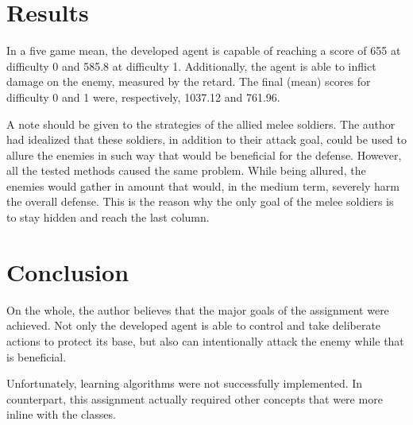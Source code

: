\documentclass[conference]{IEEEtran}
\begin{document}
\section{Results}

In a five game mean, the developed agent is capable of reaching a score of 655 at difficulty 0 and 585.8 at difficulty 1. Additionally, the agent is able to inflict damage on the enemy, measured by the retard. The final (mean) scores for difficulty 0 and 1 were, respectively, 1037.12 and 761.96.

A note should be given to the strategies of the allied melee soldiers. The author had idealized that these soldiers, in addition to their attack goal, could be used to allure the enemies in such way that would be beneficial for the defense. However, all the tested methods caused the same problem. While being allured, the enemies would gather in amount that would, in the medium term, severely harm the overall defense. This is the reason why the only goal of the melee soldiers is to stay hidden and reach the last column.

\section{Conclusion}

On the whole, the author believes that the major goals of the assignment were achieved. Not only the developed agent is able to control and take deliberate actions to protect its base, but also can intentionally attack the enemy while that is beneficial. 

Unfortunately, learning algorithms were not successfully implemented. In counterpart, this assignment actually required other concepts that were more inline with the classes.








\end{document}
